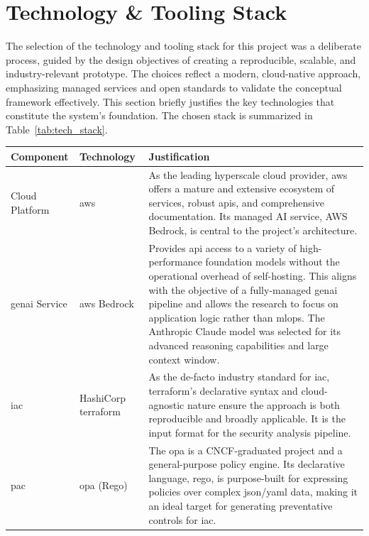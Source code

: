 \section{Technology \& Tooling Stack}
\label{sec:tech_stack}

The selection of the technology and tooling stack for this project was a deliberate process, guided by the design objectives of creating a reproducible, scalable, and industry-relevant prototype. The choices reflect a modern, \gls{cloud-native} approach, emphasizing managed services and open standards to validate the conceptual framework effectively. This section briefly justifies the key technologies that constitute the system's foundation. The chosen stack is summarized in Table~\ref{tab:tech_stack}.

\begin{center}
\begin{tabular}{|l|l|p{7cm}|}
\hline
\textbf{Component} & \textbf{Technology} & \textbf{Justification} \\
\hline
Cloud Platform & \gls{aws} & As the leading hyperscale cloud provider, \gls{aws} offers a mature and extensive ecosystem of services, robust \gls{api}s, and comprehensive documentation. Its managed AI service, AWS Bedrock, is central to the project's architecture. \\
\hline
\gls{genai} Service & \gls{aws} Bedrock \cite{noauthor_claude_nodate} & Provides \gls{api} access to a variety of high-performance foundation models without the operational overhead of self-hosting. This aligns with the objective of a fully-managed \gls{genai} pipeline and allows the research to focus on application logic rather than \gls{mlops}. The Anthropic Claude model was selected for its advanced reasoning capabilities and large context window. \\
\hline
\gls{iac} & HashiCorp \gls{terraform} \cite{noauthor_terraform_nodate} & As the de-facto industry standard for \gls{iac}, \gls{terraform}'s declarative syntax and cloud-agnostic nature ensure the approach is both reproducible and broadly applicable. It is the input format for the security analysis pipeline. \\
\hline
\gls{pac} & \gls{opa} (Rego) \cite{noauthor_introduction_nodate} & The \gls{opa} is a CNCF-graduated project and a general-purpose policy engine. Its declarative language, \gls{rego}, is purpose-built for expressing policies over complex \gls{json}/\gls{yaml} data, making it an ideal target for generating preventative controls for \gls{iac}. \\

\end{tabular}
\end{center}
